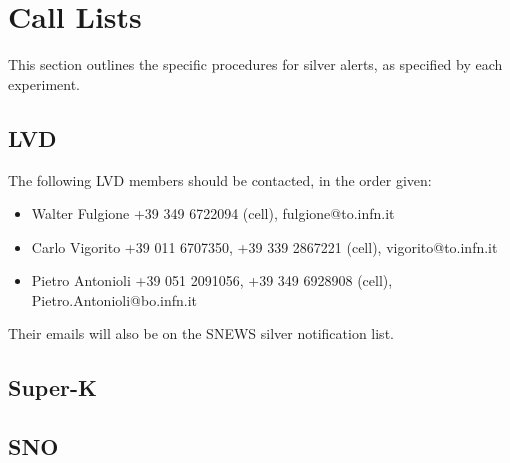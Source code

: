\documentclass{article}
\begin{document}
\section{Call Lists}      

This section outlines the specific procedures for silver alerts, as
specified by each experiment.

\subsection{LVD}

The following LVD members should be contacted, in the order given:

\begin{itemize}
\item Walter Fulgione +39 349 6722094 (cell), fulgione@to.infn.it

\item Carlo Vigorito +39 011 6707350, +39 339 2867221 (cell), vigorito@to.infn.it

\item Pietro Antonioli +39 051 2091056, +39 349 6928908 (cell), Pietro.Antonioli@bo.infn.it
\end{itemize}

Their emails will also be on the SNEWS silver notification list.

\subsection{Super-K}


\subsection{SNO}
\end{document}
